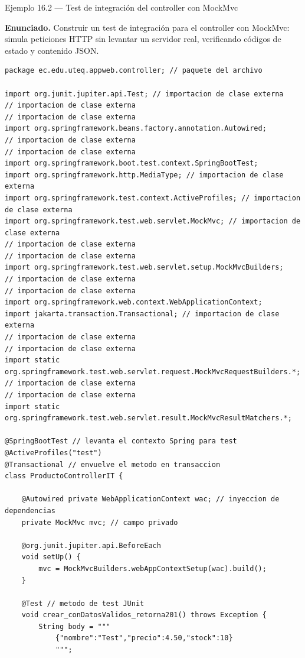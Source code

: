 \begin{cajaejemplo}{Ejemplo 16.2 --- Test de integración del controller con MockMvc}

\textbf{Enunciado.} Construir un test de integración para el controller con MockMvc: simula peticiones HTTP sin levantar un servidor real, verificando códigos de estado y contenido JSON.

\begin{lstlisting}[style=java,caption={ProductoControllerIT.java},label=lst:16.2]
package ec.edu.uteq.appweb.controller; // paquete del archivo

import org.junit.jupiter.api.Test; // importacion de clase externa
// importacion de clase externa
// importacion de clase externa
import org.springframework.beans.factory.annotation.Autowired;
// importacion de clase externa
// importacion de clase externa
import org.springframework.boot.test.context.SpringBootTest;
import org.springframework.http.MediaType; // importacion de clase externa
import org.springframework.test.context.ActiveProfiles; // importacion de clase externa
import org.springframework.test.web.servlet.MockMvc; // importacion de clase externa
// importacion de clase externa
// importacion de clase externa
import org.springframework.test.web.servlet.setup.MockMvcBuilders;
// importacion de clase externa
// importacion de clase externa
import org.springframework.web.context.WebApplicationContext;
import jakarta.transaction.Transactional; // importacion de clase externa
// importacion de clase externa
// importacion de clase externa
import static org.springframework.test.web.servlet.request.MockMvcRequestBuilders.*;
// importacion de clase externa
// importacion de clase externa
import static org.springframework.test.web.servlet.result.MockMvcResultMatchers.*;

@SpringBootTest // levanta el contexto Spring para test
@ActiveProfiles("test")
@Transactional // envuelve el metodo en transaccion
class ProductoControllerIT {

    @Autowired private WebApplicationContext wac; // inyeccion de dependencias
    private MockMvc mvc; // campo privado

    @org.junit.jupiter.api.BeforeEach
    void setUp() {
        mvc = MockMvcBuilders.webAppContextSetup(wac).build();
    }

    @Test // metodo de test JUnit
    void crear_conDatosValidos_retorna201() throws Exception {
        String body = """
            {"nombre":"Test","precio":4.50,"stock":10}
            """;


\end{lstlisting}
\end{cajaejemplo}
